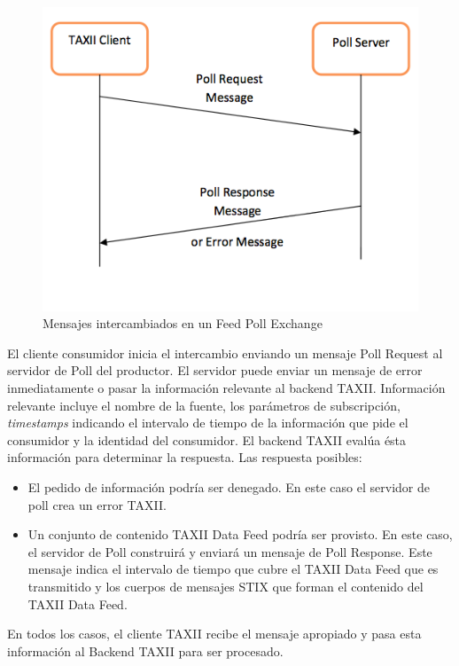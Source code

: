 \begin{figure}[H]
  \centering
    \includegraphics[width=130mm]{./images/FeedPollExchange.png}
    \caption{Mensajes intercambiados en un Feed Poll Exchange \protect\cite{b1}}
\end{figure}

El cliente consumidor inicia el intercambio enviando un mensaje Poll Request al 
servidor de Poll del productor. El servidor puede enviar un mensaje de error 
inmediatamente o pasar la información relevante al backend TAXII. Información 
relevante incluye el nombre de la fuente, los parámetros de subscripción, 
\textit{timestamps} indicando el intervalo de tiempo de la información que pide el 
consumidor y la identidad del consumidor. El backend TAXII evalúa ésta
información para determinar la respuesta. Las respuesta posibles:
\begin{itemize}
  \item El pedido de información podría ser denegado. En este caso el servidor 
  de poll crea un error TAXII. 
  \item Un conjunto de contenido TAXII Data Feed podría ser provisto. En este 
  caso, el servidor de Poll construirá y enviará un mensaje de Poll Response. 
  Este mensaje indica el intervalo de tiempo que cubre el TAXII Data Feed que es 
  transmitido y los cuerpos de mensajes STIX que forman el contenido del TAXII 
  Data Feed.
\end{itemize}
En todos los casos, el cliente TAXII recibe el mensaje apropiado y pasa esta 
información al Backend TAXII para ser procesado.

